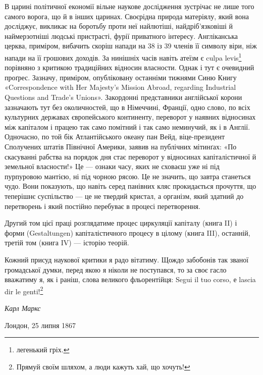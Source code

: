 В царині політичної економії вільне наукове дослідження
зустрічає не лише того самого ворога, що й в інших царинах.
Своєрідна природа матеріялу, який вона досліджує, викликає на
боротьбу проти неї найлютіші, найдріб’язковіші й наймерзотніші
людські пристрасті, фурії приватного інтересу. Англіканська
церква, приміром, вибачить скоріш напади на 38 із 39 членів
її символу віри, ніж напади на  її грошових доходів. За нинішніх
часів навіть атеїзм є culpa levis\footnote*{
легенький гріх. 
} порівняно з критикою
традиційних відносин власности. Однак і тут є очевидний проґрес.
Зазначу, приміром, опубліковану останніми тижнями Синю
Книгу «Correspondence with Her Majesty’s Mission Abroad, regarding
Industrial Questions and Trade’s Unions». Закордонні
представники англійської корони зазначають тут без околичностей,
що в Німеччині, Франції, одно слово, по всіх культурних
державах європейського континенту, переворот у наявних відносинах
між капіталом і працею так само помітний і так само неминучий,
як і в Англії. Одночасно, по той бік Атлантійського океану
пан Вейд, віце-президент Сполучених штатів Північної Америки,
заявив на публічних мітинґах: «По скасуванні рабства
на порядок дня стає переворот у відносинах капіталістичної й
земельної власности!» Це — ознаки часу, яких не сховаєш уже
ні під пурпуровою мантією, ні під чорною рясою. Це не значить,
що завтра станеться чудо. Вони показують, що навіть серед панівних
кляс прокидається прочуття, що теперішнє суспільство —
це не твердий кристал, а організм, який здатний до перетворень
і який постійно перебуває в процесі перетворення.

Другий том цієї праці розглядатиме процес циркуляції капіталу
(книга II) і форми (Gestaltungen) капіталістичного процесу
в цілому (книга III), останній, третій том (книга IV) — історію
теорій.

Кожний присуд наукової критики я радо вітатиму. Щождо
забобонів так званої громадської думки, перед якою я ніколи не
поступався, то за своє гасло вважатиму я, як і раніш, слова великого
фльорентійця: Segui il tuo corso, е lascia dir le genti!\footnote*{
Прямуй своїм шляхом, а люди кажуть хай, що хочуть! 
}

\begin{flushright}
  \emph{Карл Маркс}
\end{flushright}

{\small Лондон, 25 липня 1867~}
